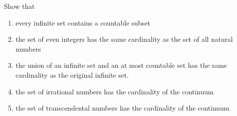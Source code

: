 \documentclass{article}
\begin{document}
    \begin{exercise}[Zorich 2.4.3]
    Show that 
    \begin{enumerate}
        \item every infinite set contains a countable subset
        \item the set of even integers has the same cardinality as the set of all natural numbers
        \item the union of an infinite set and an at most countable set has the same cardinality as the original infinite set. 
        \item the set of irrational numbers has the cardinality of the continuum 
        \item the set of transcendental numbers has the cardinality of the continuum
    \end{enumerate}
    \end{exercise}
\end{document}
